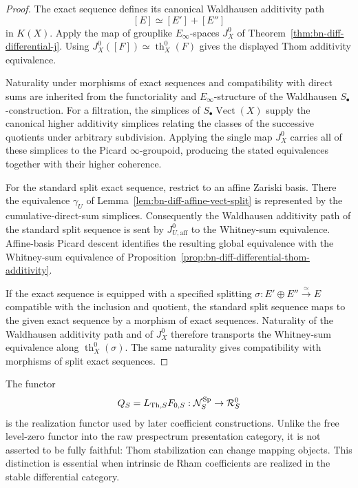 \begin{proof}
The exact sequence defines its canonical Waldhausen additivity path
\[
  [E]\simeq[E']+[E'']
\]
in \(K(X)\).  Apply the map of grouplike \(E_\infty\)-spaces
\(J_X^0\) of Theorem~\ref{thm:bn-diff-differential-j}.  Using
\(J_X^0([F])\simeq\operatorname{th}^0_X(F)\) gives the displayed Thom
additivity equivalence.

Naturality under morphisms of exact sequences and compatibility with direct
sums are inherited from the functoriality and \(E_\infty\)-structure of the
Waldhausen \(S_\bullet\)-construction.  For a filtration, the simplices of
\(S_\bullet\operatorname{Vect}(X)\) supply the canonical higher additivity
simplices relating the classes of the successive quotients under arbitrary
subdivision.  Applying the single map \(J_X^0\) carries all of these simplices
to the Picard \(\infty\)-groupoid, producing the stated equivalences together
with their higher coherence.

For the standard split exact sequence, restrict to an affine Zariski basis.
There the equivalence $\gamma_U$ of
Lemma~\ref{lem:bn-diff-affine-vect-split} is represented by the
cumulative-direct-sum simplices.  Consequently the Waldhausen additivity path
of the standard split sequence is sent by
$J_{U,\mathrm{aff}}^0$ to the Whitney-sum equivalence.  Affine-basis Picard
descent identifies the resulting global equivalence with the Whitney-sum
equivalence of
Proposition~\ref{prop:bn-diff-differential-thom-additivity}.

If the exact sequence is equipped with a specified splitting
$\sigma:E'\oplus E''\xrightarrow{\simeq}E$ compatible with the inclusion and
quotient, the standard split sequence maps to the given exact sequence by a
morphism of exact sequences.  Naturality of
the Waldhausen additivity path and of $J_X^0$ therefore transports the
Whitney-sum equivalence along $\operatorname{th}^0_X(\sigma)$.  The same
naturality gives compatibility with morphisms of split exact sequences.
\end{proof}

\begin{remark}
\label{rem:bn-diff-Q-not-fully-faithful}
The functor
\[
  Q_S=L_{\mathrm{Th},S}F_{0,S}:\mathcal N_S^{\mathrm{Sp}}\to\mathcal R_S^0
\]
is the realization functor used by later coefficient constructions.  Unlike
the free level-zero functor into the raw prespectrum presentation category, it
is not asserted to be fully faithful: Thom stabilization can change mapping
objects.  This distinction is essential when intrinsic de Rham coefficients
are realized in the stable differential category.
\end{remark}

